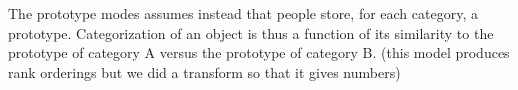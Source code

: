 \documentclass{article}
\newcommand{\cas}[1]{ \textsf{\color{darkgray} \scriptsize #1} }
\begin{document}



The prototype modes assumes instead that people store, for each category, a prototype. Categorization of an object is thus a function of its similarity to the prototype of category A versus the prototype of category B.
\cas{(this model produces rank orderings but we did a transform so that it gives numbers)}


\end{document}
